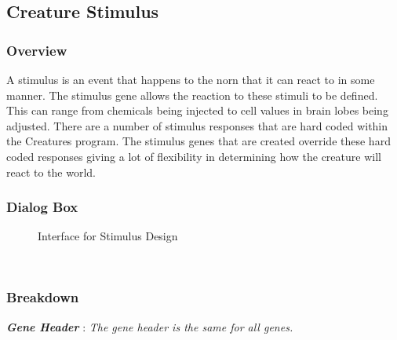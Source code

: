 \documentclass[11pt,twoside,a4paper]{article}
\begin{document}
\subsection{Creature Stimulus} %
\begin{minipage}{0.5\linewidth}
\subsubsection{Overview}
A stimulus is an event that happens to the norn that it can react to in some manner. The stimulus gene allows the reaction to these stimuli to be defined. This can range from chemicals being injected to cell values in brain lobes being adjusted. There are a number of stimulus responses that are hard coded within the Creatures program. The stimulus genes that are created override these hard coded responses giving a lot of flexibility in determining how the creature will react to the world.~\\
\end{minipage}
\begin{minipage}{0.1\linewidth}\end{minipage}
\begin{minipage}{0.4\linewidth}
\subsubsection{Dialog Box}
\begin{figure}[H]
	\centerline {} %
	\caption{Interface for Stimulus Design}
	\label{fig:genes_stimulus}
\end{figure}
\end{minipage}~\\

\subsubsection{Breakdown}

\textbf{\textit{Gene Header}} : \emph{The gene header is the same for all genes.}~\\
\end{document}
